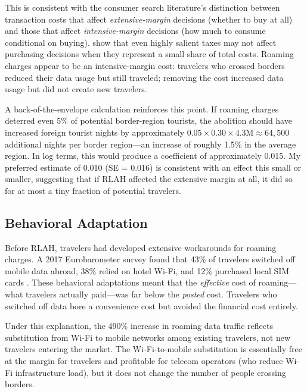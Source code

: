 \documentclass[12pt]{article}
\begin{document}
This is consistent with the consumer search literature's distinction between transaction costs that affect \textit{extensive-margin} decisions (whether to buy at all) and those that affect \textit{intensive-margin} decisions (how much to consume conditional on buying). \citet{chetty2009} show that even highly salient taxes may not affect purchasing decisions when they represent a small share of total costs. Roaming charges appear to be an intensive-margin cost: travelers who crossed borders reduced their data usage but still traveled; removing the cost increased data usage but did not create new travelers.

A back-of-the-envelope calculation reinforces this point. If roaming charges deterred even 5\% of potential border-region tourists, the abolition should have increased foreign tourist nights by approximately $0.05 \times 0.30 \times 4.3\text{M} \approx 64,500$ additional nights per border region---an increase of roughly 1.5\% in the average region. In log terms, this would produce a coefficient of approximately 0.015. My preferred estimate of 0.010 (SE = 0.016) is consistent with an effect this small or smaller, suggesting that if RLAH affected the extensive margin at all, it did so for at most a tiny fraction of potential travelers.

\subsection{Behavioral Adaptation}

Before RLAH, travelers had developed extensive workarounds for roaming charges. A 2017 Eurobarometer survey found that 43\% of travelers switched off mobile data abroad, 38\% relied on hotel Wi-Fi, and 12\% purchased local SIM cards \citep{eurobarometer2017}. These behavioral adaptations meant that the \textit{effective} cost of roaming---what travelers actually paid---was far below the \textit{posted} cost. Travelers who switched off data bore a convenience cost but avoided the financial cost entirely.

Under this explanation, the 490\% increase in roaming data traffic reflects substitution from Wi-Fi to mobile networks among existing travelers, not new travelers entering the market. The Wi-Fi-to-mobile substitution is essentially free at the margin for travelers and profitable for telecom operators (who reduce Wi-Fi infrastructure load), but it does not change the number of people crossing borders.
\end{document}
